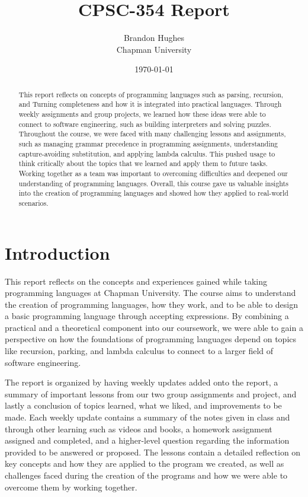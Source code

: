 \documentclass{article}
\title{CPSC-354 Report}
\author{Brandon Hughes \\ Chapman University}
\date{\today}
\theoremstyle{theorem}
\theoremstyle{definition}
\theoremstyle{remark}
\begin{document}
\maketitle

\begin{abstract}
  This report reflects on concepts of programming languages such as parsing, recursion, and Turning completeness and how it 
 is integrated into practical languages. Through weekly assignments and group projects, we learned how these
 ideas were able to connect to software engineering, such as building interpreters and solving puzzles. 
 Throughout the course, we were faced with many challenging lessons and assignments, such as managing grammar precedence
 in programming assignments, understanding capture-avoiding substitution, and applying lambda calculus. This pushed usage
 to think critically about the topics that we learned and apply them to future tasks. Working 
 together as a team was important to overcoming difficulties and deepened our understanding of programming languages. Overall,
 this course gave us valuable insights into the creation of programming languages and showed how they applied
 to real-world scenarios.
\end{abstract}

\setcounter{tocdepth}{3}
\tableofcontents

\section{Introduction}\label{intro}

This report reflects on the concepts and experiences gained while taking programming languages at 
Chapman University. The course aims to understand the creation of programming languages, how they work, 
and to be able to design a basic programming language through accepting expressions. By combining a 
practical and a theoretical component into our coursework, we were able to gain a perspective on how the 
foundations of programming languages depend on topics like recursion, parking, and lambda calculus to 
connect to a larger field of software engineering.

The report is organized by having weekly updates added onto the report, a summary of important lessons 
from our two group assignments and project, and lastly a conclusion of topics learned, what we liked, 
and improvements to be made. Each weekly update contains a summary of the notes given in class and 
through other learning such as videos and books, a homework assignment assigned and completed, and 
a higher-level question regarding the information provided to be answered or proposed. The lessons 
contain a detailed reflection on key concepts and how they are applied to the program we created, as 
well as challenges faced during the creation of the programs and how we were able to overcome them by 
working together.
\end{document}
